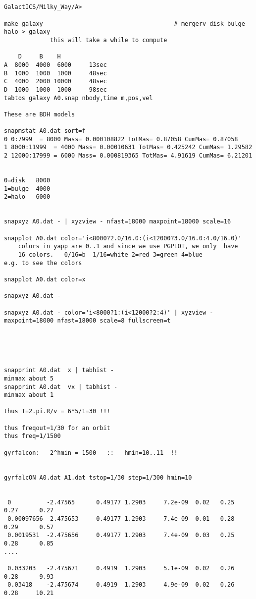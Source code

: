 \footnotesize\begin{verbatim}


GalactICS/Milky_Way/A> 

make galaxy                                     # mergerv disk bulge halo > galaxy
             this will take a while to compute

    D     B    H
A  8000  4000  6000     13sec
B  1000  1000  1000     48sec
C  4000  2000 10000     48sec
D  1000  1000  1000     98sec
tabtos galaxy A0.snap nbody,time m,pos,vel

These are BDH models 

snapmstat A0.dat sort=f
0 0:7999  = 8000 Mass= 0.000108822 TotMas= 0.87058 CumMas= 0.87058
1 8000:11999  = 4000 Mass= 0.00010631 TotMas= 0.425242 CumMas= 1.29582
2 12000:17999 = 6000 Mass= 0.000819365 TotMas= 4.91619 CumMas= 6.21201


0=disk   8000
1=bulge  4000
2=halo   6000


snapxyz A0.dat - | xyzview - nfast=18000 maxpoint=18000 scale=16

snapplot A0.dat color='i<8000?2.0/16.0:(i<12000?3.0/16.0:4.0/16.0)'
    colors in yapp are 0..1 and since we use PGPLOT, we only  have
    16 colors.   0/16=b  1/16=white 2=red 3=green 4=blue
e.g. to see the colors

snapplot A0.dat color=x

snapxyz A0.dat - 

snapxyz A0.dat - color='i<8000?1:(i<12000?2:4)' | xyzview - maxpoint=18000 nfast=18000 scale=8 fullscreen=t





snapprint A0.dat  x | tabhist -
minmax about 5
snapprint A0.dat  vx | tabhist -
minmax about 1

thus T=2.pi.R/v = 6*5/1=30 !!!

thus freqout=1/30 for an orbit
thus freq=1/1500 

gyrfalcon:   2^hmin = 1500   ::   hmin=10..11  !!


gyrfalcON A0.dat A1.dat tstop=1/30 step=1/300 hmin=10


 0          -2.47565      0.49177 1.2903     7.2e-09  0.02   0.25       0.27      0.27
 0.00097656 -2.475653     0.49177 1.2903     7.4e-09  0.01   0.28       0.29      0.57
 0.0019531  -2.475656     0.49177 1.2903     7.4e-09  0.03   0.25       0.28      0.85
....

 0.033203   -2.475671     0.4919  1.2903     5.1e-09  0.02   0.26       0.28      9.93
 0.03418    -2.475674     0.4919  1.2903     4.9e-09  0.02   0.26       0.28     10.21


\end{verbatim}
